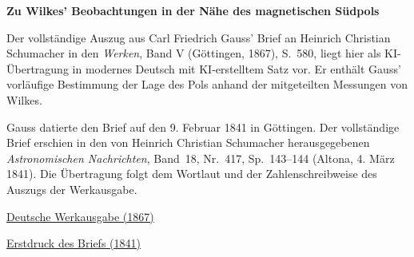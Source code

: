\clearpage
\thispagestyle{empty}
\begin{center}\Large\textbf{Zu Wilkes’ Beobachtungen in der Nähe des magnetischen Südpols}\end{center}

Der vollständige Auszug aus Carl Friedrich Gauss’ Brief an Heinrich Christian Schumacher in den \textit{Werken}, Band V (Göttingen, 1867), S.~580, liegt hier als KI-Übertragung in modernes Deutsch mit KI-erstelltem Satz vor. Er enthält Gauss’ vorläufige Bestimmung der Lage des Pols anhand der mitgeteilten Messungen von Wilkes.

Gauss datierte den Brief auf den 9. Februar 1841 in Göttingen. Der vollständige Brief erschien in den von Heinrich Christian Schumacher herausgegebenen \textit{Astronomischen Nachrichten}, Band~18, Nr.~417, Sp.~143--144 (Altona, 4. März 1841). Die Übertragung folgt dem Wortlaut und der Zahlenschreibweise des Auszugs der Werkausgabe.

\medskip\noindent
\href{https://gdz.sub.uni-goettingen.de/id/PPN236006339}{Deutsche Werkausgabe (1867)}\par
\noindent\href{https://archive.org/details/astronomischena00berlgoog/page/n80/mode/2up}{Erstdruck des Briefs (1841)}
\clearpage
